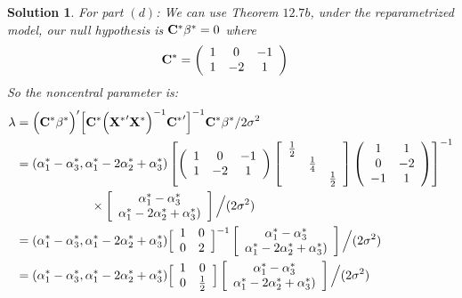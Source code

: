 \documentclass[11pt]{article}
\newtheorem{sol}{Solution}
\begin{document}
\begin{sol}
	For part $(d)$:\vskip 2mm
	We can use Theorem $12.7b$, under the reparametrized model, our null hypothesis is ${\bf C}^{\ast}\beta^{\ast} = 0$ where
	\begin{align*}
		{\bf C}^{\ast} &= \left(\begin{array}{ccc} 1&0&-1\\ 1&-2&1\end{array}\right)
	\end{align*}
	So the noncentral parameter is:
	\begin{align*}
		\lambda &= \Big({\bf C}^{\ast}{\bf \beta}^{\ast}\Big)'\Big[{\bf C}^{\ast}\Big({\bf X^{\ast}}'{\bf X^{\ast}}\Big)^{-1}{\bf C^{\ast}}'\Big]^{-1}{\bf C^{\ast}}{\bf \beta^{\ast}}/2\sigma^2\\
		&= (\alpha_1^{\ast} - \alpha_3^{\ast}, \alpha^{\ast}_1 - 2\alpha^{\ast}_2 + \alpha^{\ast}_3)\left[\left(\begin{array}{ccc} 1&0&-1\\ 1&-2&1\end{array}\right)\left[\begin{array}{ccc} \frac{1}{2}&&\\ &\frac{1}{4}&\\ &&\frac{1}{2}\end{array}\right]\left(\begin{array}{cc} 1&1\\0 &-2\\ -1&1\end{array}\right)\right]^{-1}\\
		&\ \hskip 2cm \times\left[\begin{array}{c} \alpha_1^{\ast} - \alpha_3^{\ast}\\ \alpha^{\ast}_1 - 2\alpha^{\ast}_2 + \alpha^{\ast}_3)\end{array}\right]\Big/(2\sigma^2)\\
		&= (\alpha_1^{\ast} - \alpha_3^{\ast}, \alpha^{\ast}_1 - 2\alpha^{\ast}_2 + \alpha^{\ast}_3)\Big[\begin{array}{cc} 1&0 \\ 0&2 \end{array}\Big]^{-1}\left[\begin{array}{c} \alpha_1^{\ast} - \alpha_3^{\ast}\\ \alpha^{\ast}_1 - 2\alpha^{\ast}_2 + \alpha^{\ast}_3)\end{array}\right]\Big/(2\sigma^2)\\
		&= (\alpha_1^{\ast} - \alpha_3^{\ast}, \alpha^{\ast}_1 - 2\alpha^{\ast}_2 + \alpha^{\ast}_3)\Big[\begin{array}{cc} 1&0 \\ 0&\frac{1}{2} \end{array}\Big]\left[\begin{array}{c} \alpha_1^{\ast} - \alpha_3^{\ast}\\ \alpha^{\ast}_1 - 2\alpha^{\ast}_2 + \alpha^{\ast}_3)\end{array}\right]\Big/(2\sigma^2)\\

\end{align*}
\end{sol}
\end{document}

